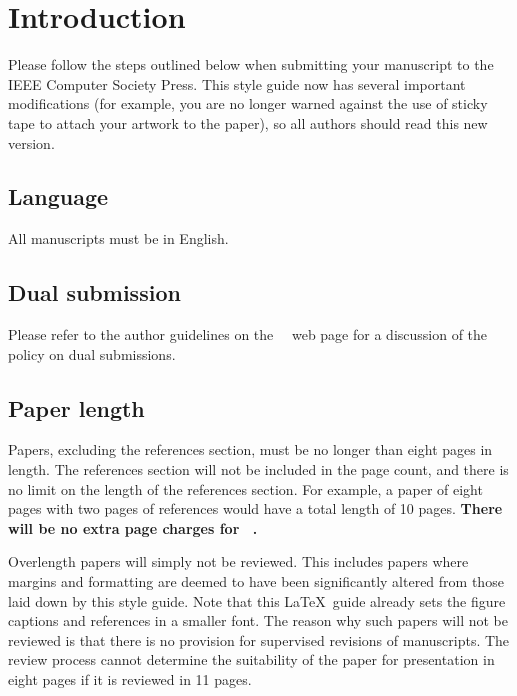 \section{Introduction}
\label{sec:intro}

Please follow the steps outlined below when submitting your manuscript to the IEEE Computer Society Press.
This style guide now has several important modifications (for example, you are no longer warned against the use of sticky tape to attach your artwork to the paper), so all authors should read this new version. 



\subsection{Language}

All manuscripts must be in English.

\subsection{Dual submission}

Please refer to the author guidelines on the \confName\ \confYear\ web page for a
discussion of the policy on dual submissions.

\subsection{Paper length}
Papers, excluding the references section, must be no longer than eight pages in length.
The references section will not be included in the page count, and there is no limit on the length of the references section.
For example, a paper of eight pages with two pages of references would have a total length of 10 pages.
{\bf There will be no extra page charges for \confName\ \confYear.}

Overlength papers will simply not be reviewed.
This includes papers where margins and formatting are deemed to have been significantly altered from those laid down by this style guide.
Note that this \LaTeX\ guide already sets the figure captions and references in a smaller font.
The reason why such papers will not be reviewed is that there is no provision for supervised revisions of manuscripts.
The review process cannot determine the suitability of the paper for presentation in eight pages if it is reviewed in 11 pages.


